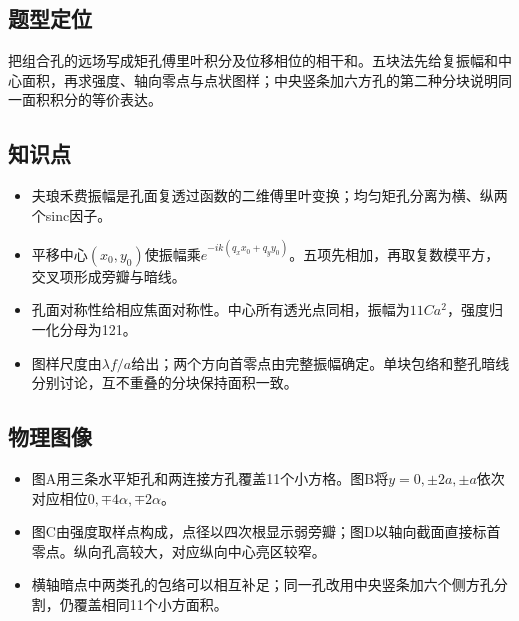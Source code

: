\documentclass[UTF8,fontset=fandol,a4paper,11pt]{ctexart}
\begin{document}
\subsection*{题型定位}

把组合孔的远场写成矩孔傅里叶积分及位移相位的相干和。五块法先给复振幅和中心面积，再求强度、轴向零点与点状图样；中央竖条加六方孔的第二种分块说明同一面积积分的等价表达。



\subsection*{知识点}

\begin{itemize}
\item 夫琅禾费振幅是孔面复透过函数的二维傅里叶变换；均匀矩孔分离为横、纵两个sinc因子。
\item 平移中心$(x_0,y_0)$使振幅乘$e^{-ik(q_xx_0+q_yy_0)}$。五项先相加，再取复数模平方，交叉项形成旁瓣与暗线。
\item 孔面对称性给相应焦面对称性。中心所有透光点同相，振幅为$11Ca^2$，强度归一化分母为121。
\item 图样尺度由$\lambda f/a$给出；两个方向首零点由完整振幅确定。单块包络和整孔暗线分别讨论，互不重叠的分块保持面积一致。
\end{itemize}



\subsection*{物理图像}

\begin{itemize}
\item 图A用三条水平矩孔和两连接方孔覆盖11个小方格。图B将$y=0,\pm2a,\pm a$依次对应相位$0,\mp4\alpha,\mp2\alpha$。
\item 图C由强度取样点构成，点径以四次根显示弱旁瓣；图D以轴向截面直接标首零点。纵向孔高较大，对应纵向中心亮区较窄。
\item 横轴暗点中两类孔的包络可以相互补足；同一孔改用中央竖条加六个侧方孔分割，仍覆盖相同11个小方面积。
\end{itemize}


\end{document}
